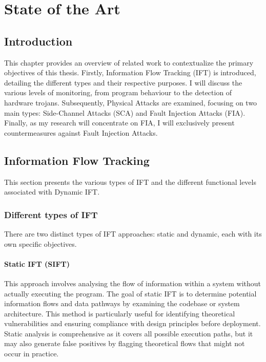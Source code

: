 \chapter{State of the Art}
\label{chapter:soa}
\minitoc


\section{Introduction}
This chapter provides an overview of related work to contextualize the primary objectives of this thesis. Firstly, Information Flow Tracking (IFT) is introduced, detailing the different types and their respective purposes. I will discuss the various levels of monitoring, from program behaviour to the detection of hardware trojans.
Subsequently, Physical Attacks are examined, focusing on two main types: Side-Channel Attacks (SCA) and Fault Injection Attacks (FIA).
Finally, as my research will concentrate on FIA, I will exclusively present countermeasures against Fault Injection Attacks.

\section{Information Flow Tracking}
This section presents the various types of IFT and the different functional levels associated with Dynamic IFT.

    \subsection{Different types of IFT}
    There are two distinct types of IFT approaches: static and dynamic, each with its own specific objectives.

        \subsubsection{Static IFT (SIFT)}
        This approach involves analysing the flow of information within a system without actually executing the program. The goal of static IFT is to determine potential information flows and data pathways by examining the codebase or system architecture. This method is particularly useful for identifying theoretical vulnerabilities and ensuring compliance with design principles before deployment. Static analysis is comprehensive as it covers all possible execution paths, but it may also generate false positives by flagging theoretical flows that might not occur in practice.

